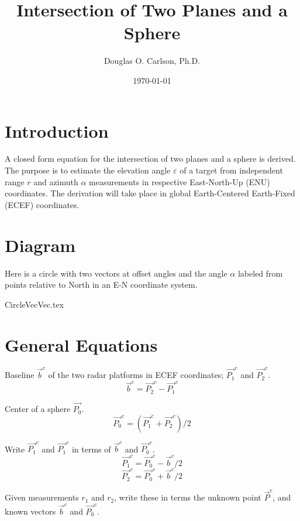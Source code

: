 \documentclass[12pt]{article}
\title{\textbf{Intersection of Two Planes and a Sphere}}
\author{Douglas O. Carlson, Ph.D.}
\date{\today}
\begin{document}
	\maketitle
	
	\section{Introduction}
	A closed form equation for the intersection of two planes and a sphere is derived. The purpose is to estimate the elevation angle $\varepsilon$ of a target from independent range $r$ and azimuth $\alpha$ measurements in respective East-North-Up (ENU) coordinates. The derivation will take place in global Earth-Centered Earth-Fixed (ECEF) coordinates.
	
	\section{Diagram}
	Here is a circle with two vectors at offset angles and the angle $\alpha$ labeled from points relative to North in an E-N coordinate system.
	
	\begin{center}
		{CircleVecVec.tex}
	\end{center}
	
	\section{General Equations}
	Baseline $\vec{b}^c$ of the two radar platforms in ECEF coordinates; $\vec{P_1}^c$ and $\vec{P_2}^c$.
	\begin{equation}
		\vec{b}^c = \vec{P_2}^c - \vec{P_1}^c
	\end{equation}

	Center of a sphere $\vec{P_0}$.
	\begin{equation}
		\vec{P_0}^c = (\vec{P_1}^c + \vec{P_2}^c)/2
	\end{equation}
	
	Write $\vec{P_1}^c$ and $\vec{P_1}^c$ in terms of $\vec{b}^c$ and $\vec{P_0}^c$.
	\begin{equation}
		\vec{P_1}^c = \vec{P_0}^c - \vec{b}^c / 2
	\end{equation}	
	\begin{equation}
		\vec{P_2}^c = \vec{P_0}^c + \vec{b}^c / 2
	\end{equation}	
	
	Given measurements $r_1$ and $r_2$, write these in terms the unknown point 
	$\vec{P}^c$, and known vectors $\vec{b}^c$ and $\vec{P_0}^c$.
	
\end{document}
